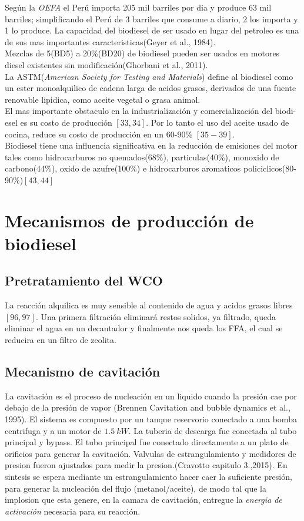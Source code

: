 \documentclass[a4paper,10pt]{article}
\begin{document}
Según la \emph{OEFA} el Perú importa 205 mil barriles por dia y produce 63 mil barriles; simplificando el Perú de 3 barriles que consume a diario, 2 los importa y 1 lo produce.
La capacidad del biodiesel de ser usado en lugar del petroleo es una de sus mas importantes caracteristicas(Geyer et al., 1984). \\
Mezclas de 5(BD5) a 20\%(BD20) de biodiesel pueden ser usados en motores diesel existentes sin modificación(Ghorbani et al., 2011).\\
La ASTM(\emph{American Society for Testing and Materials}) define al biodiesel como un ester monoalquilico de cadena larga de acidos grasos, derivados de una fuente renovable lipidica, como aceite vegetal o grasa animal.\\
El mas importante obstaculo en la industrialización y comercialización del biodi- esel es su costo de producción $[33,34]$. Por lo tanto el uso del aceite usado de cocina, reduce su costo de producción en un 60-90\% $[35-39]$. \\
Biodiesel tiene una influencia significativa en la reducción de emisiones del motor tales como hidrocarburos no quemados(68\%), particulas(40\%), monoxido de carbono(44\%), oxido de azufre(100\%) e hidrocarburos aromaticos policiclicos(80-90\%)$[43,44]$

\section{Mecanismos de producción de biodiesel}

\subsection{Pretratamiento del WCO}
La reacción alquilica es muy sensible al contenido de agua y acidos grasos libres $[96,97]$. Una primera filtración eliminará restos solidos, ya filtrado, queda eliminar el agua en un decantador y finalmente nos queda los FFA, el cual se reducira en un filtro de zeolita.

\subsection{Mecanismo de cavitación}
La cavitación es el proceso de nucleación en un liquido cuando la presión cae por debajo de la presión de vapor (Brennen Cavitation and bubble dynamics et al., 1995).
El sistema es compuesto por un tanque reservorio conectado a una bomba centrifuga y a un motor de $1.5\:kW$. La tuberia de descarga fue conectada al tubo principal y  bypass. El tubo principal fue conectado directamente a un plato de orificios para generar la cavitación. Valvulas de estrangulamiento y medidores de presion fueron ajustados para medir la presion.(Cravotto capitulo 3.,2015). En sintesis se espera mediante un estrangulamiento hacer caer la suficiente presión, para generar la nucleación del flujo (metanol/aceite), de modo tal que la implosion que esta genere, en la camara de cavitación, entregue la \emph{energia de activación} necesaria para su reacción.
\end{document}
